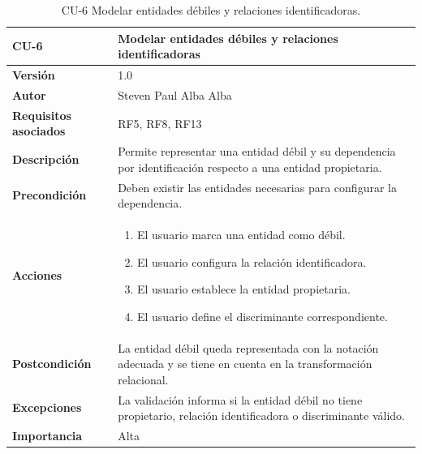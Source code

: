 \begin{table}[p]
\centering
\begin{tabularx}{\linewidth}{ p{} p{} }
\toprule
\textbf{CU-6} & \textbf{Modelar entidades débiles y relaciones identificadoras}\\
\toprule
\textbf{Versión} & 1.0 \\
\textbf{Autor} & Steven Paul Alba Alba \\
\textbf{Requisitos asociados} & RF5, RF8, RF13 \\
\textbf{Descripción} & Permite representar una entidad débil y su dependencia por identificación respecto a una entidad propietaria. \\
\textbf{Precondición} & Deben existir las entidades necesarias para configurar la dependencia. \\
\textbf{Acciones} &
\begin{enumerate}
\def\labelenumi{\arabic{enumi}.}
\tightlist
\item El usuario marca una entidad como débil.
\item El usuario configura la relación identificadora.
\item El usuario establece la entidad propietaria.
\item El usuario define el discriminante correspondiente.
\end{enumerate}\\
\textbf{Postcondición} & La entidad débil queda representada con la notación adecuada y se tiene en cuenta en la transformación relacional. \\
\textbf{Excepciones} & La validación informa si la entidad débil no tiene propietario, relación identificadora o discriminante válido. \\
\textbf{Importancia} & Alta \\
\bottomrule
\end{tabularx}
\caption{CU-6 Modelar entidades débiles y relaciones identificadoras.}
\end{table}

